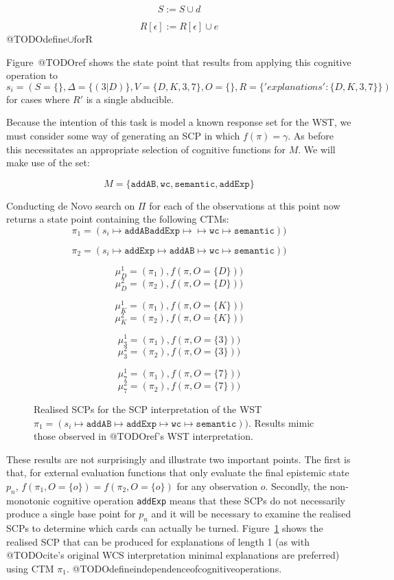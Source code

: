 \[S:=S\cup d\]

\[R[\epsilon]:=R[\epsilon] \cup e\]
@TODOdefine$\cup$forR

Figure~@TODOref shows the state point that results from applying this cognitive operation to $s_i=(S=\{\},\Delta=\{(3|D)\},V=\{D,K,3,7\},O=\{\},R=\{'explanations':\{D,K,3,7\}\})$ for cases where $R'$ is a single abducible.

Because the intention of this task is model a known response set for the WST, we must consider some way of generating an SCP in which $f(\pi)= \gamma$. As before this necessitates an appropriate selection of cognitive functions for $M$. We will make use of the set:

\[
M=\{\texttt{addAB},\texttt{wc},\texttt{semantic}, \texttt{addExp}\}
\]

Conducting de Novo search on $\Pi$ for each of the observations at this point now returns a state point containing the following CTMs:
\[
\pi_1=(s_i \longmapsto \texttt{addAB} \texttt{addExp} \longmapsto \longmapsto \texttt{wc} \longmapsto \texttt{semantic}))
\]

\[
\pi_2=(s_i \longmapsto \texttt{addExp} \longmapsto \texttt{addAB} \longmapsto \texttt{wc} \longmapsto \texttt{semantic}))
\]


\[
\mu_D^1=(\pi_1), f(\pi, O=\{D\}))
\]
\[
\mu_D^2=(\pi_2), f(\pi, O=\{D\}))
\]

\[
\mu_K^1=(\pi_1), f(\pi, O=\{K\}))
\]
\[
\mu_K^2=(\pi_2), f(\pi, O=\{K\}))
\]

\[
\mu_3^1=(\pi_1), f(\pi, O=\{3\}))
\]
\[
\mu_3^2=(\pi_2), f(\pi, O=\{3\}))
\]

\[
\mu_7^1=(\pi_1), f(\pi, O=\{7\}))
\]
\[
\mu_7^2=(\pi_2), f(\pi, O=\{7\}))
\]

\begin{figure}
\label{fig:rSCP_WST}
\caption{Realised SCPs for the SCP interpretation of the WST $\pi_1=(s_i \longmapsto \texttt{addAB} \longmapsto \texttt{addExp}  \longmapsto \texttt{wc} \longmapsto \texttt{semantic}))$. Results mimic those observed in @TODOref's WST interpretation.}
\end{figure}

These results are not surprisingly and illustrate two important points. The first is that, for external evaluation functions that only evaluate the final epistemic state $p_n$, $f(\pi_1,O=\{o\})=f(\pi_2,O=\{o\})$ for any observation $o$. Secondly, the non-monotonic cognitive operation \texttt{addExp} means that these SCPs do not necessarily produce a single base point for $p_n$ and it will be necessary to examine the realised SCPs to determine which cards can actually be turned. Figure~\ref{fig:rSCP_WST} shows the realised SCP that can be produced for explanations of length 1 (as with @TODOcite's original WCS interpretation minimal explanations are preferred) using CTM $\pi_1$. @TODOdefineindependenceofcognitiveoperations. 

